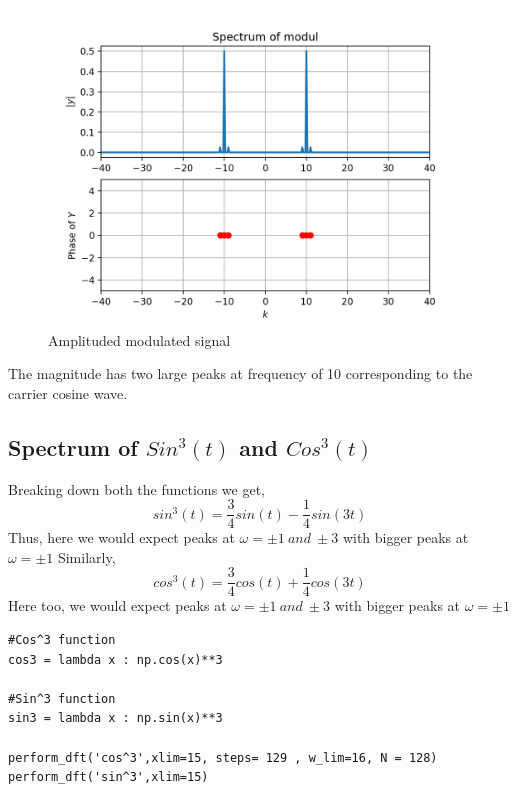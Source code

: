 \documentclass[11pt, a4paper]{article}
\begin{document}
\begin{figure}[!tbh]
   	\centering
   	\includegraphics[scale=0.7]{AM.png}   
   	\caption{Amplituded modulated signal}
   	\label{fig:Figure_1}
\end{figure}
The magnitude has two large peaks at frequency of 10 corresponding to the carrier cosine wave. 

\subsection{Spectrum of $Sin^3(t)$ and $Cos^3(t)$}
Breaking down both the functions we get,
$$
sin^3(t) = \frac{3}{4}sin(t) - \frac{1}{4}sin(3t)
$$
Thus, here we would expect peaks at $\omega = \pm 1\ and\ \pm 3$ with bigger peaks at $\omega = \pm 1$
Similarly,
$$
cos^3(t) = \frac{3}{4}cos(t) + \frac{1}{4}cos(3t)
$$
Here too, we would expect peaks at $\omega = \pm 1\ and\ \pm 3$ with bigger peaks at $\omega = \pm 1$

\begin{lstlisting}
#Cos^3 function
cos3 = lambda x : np.cos(x)**3

#Sin^3 function
sin3 = lambda x : np.sin(x)**3

perform_dft('cos^3',xlim=15, steps= 129 , w_lim=16, N = 128)
perform_dft('sin^3',xlim=15)
\end{lstlisting}
\end{document}
